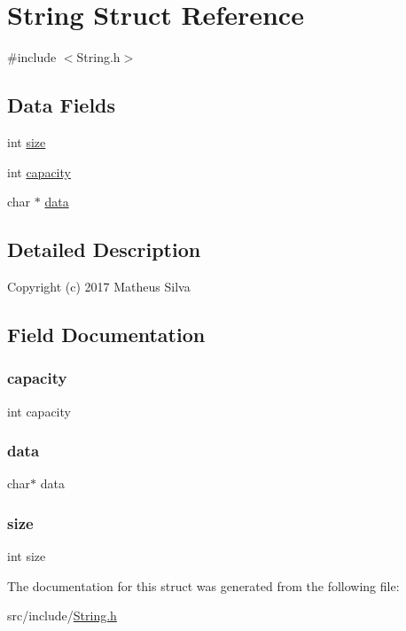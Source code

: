 \hypertarget{struct_string}{}\section{String Struct Reference}
\label{struct_string}


{\ttfamily \#include $<$String.\+h$>$}

\subsection*{Data Fields}
\begin{DoxyCompactItemize}
\item 
int \hyperlink{struct_string_a439227feff9d7f55384e8780cfc2eb82}{size}
\item 
int \hyperlink{struct_string_adbe66a087ac3fd4a5b0566f64ca2d12b}{capacity}
\item 
char $\ast$ \hyperlink{struct_string_a91a70b77df95bd8b0830b49a094c2acb}{data}
\end{DoxyCompactItemize}


\subsection{Detailed Description}
Copyright (c) 2017 Matheus Silva 

\subsection{Field Documentation}
\mbox{\label{struct_string_adbe66a087ac3fd4a5b0566f64ca2d12b}} 
\subsubsection{\texorpdfstring{capacity}{capacity}}
{\footnotesize\ttfamily int capacity}

\mbox{\label{struct_string_a91a70b77df95bd8b0830b49a094c2acb}} 
\subsubsection{\texorpdfstring{data}{data}}
{\footnotesize\ttfamily char$\ast$ data}

\mbox{\label{struct_string_a439227feff9d7f55384e8780cfc2eb82}} 
\subsubsection{\texorpdfstring{size}{size}}
{\footnotesize\ttfamily int size}



The documentation for this struct was generated from the following file\+:\begin{DoxyCompactItemize}
\item 
src/include/\hyperlink{_string_8h}{String.\+h}\end{DoxyCompactItemize}
